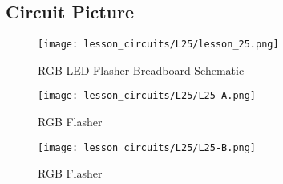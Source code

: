 \subsection{Circuit Picture}
\begin{figure}[!h]
    \centering
    \texttt{[image: lesson\_circuits/L25/lesson\_25.png]}
    \caption{RGB LED Flasher Breadboard Schematic}
    \label{fig:555_rgb_sch}
\end{figure}
\begin{figure}[!h]
    \centering
    \texttt{[image: lesson\_circuits/L25/L25-A.png]}
    \caption{RGB Flasher}
    \label{fig:555_rgb_obb}
\end{figure}
\begin{figure}[!h]
    \centering
    \texttt{[image: lesson\_circuits/L25/L25-B.png]}
    \caption{RGB Flasher}
    \label{fig:555_rgb_obb1}
\end{figure}